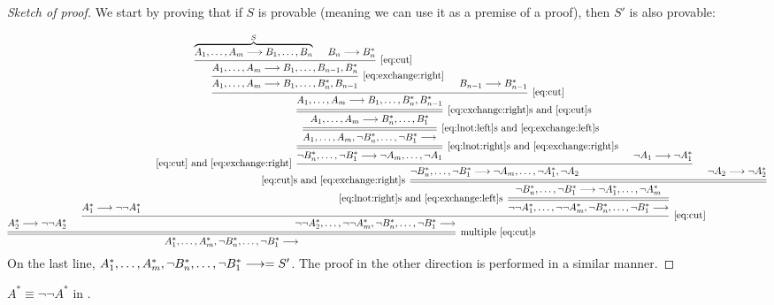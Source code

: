 \documentclass[11pt,a4paper]{article}
\begin{document}
\begin{proof}[Sketch of proof]
    We start by proving that if \(S\) is provable (meaning we can use it as a premise of a proof),
    then \(S'\) is also provable:
    \tiny

    \begin{equation*}
        \begin{prooftree}
            \hypo{A_2^\ast\seq\lnot\lnot A_2^\ast}
            \hypo{A_1^\ast\seq\lnot\lnot A_1^\ast}
            \hypo{\overbrace{A_1,\ldots,A_m\seq B_1,\ldots,B_n}^{S}}
            \hypo{B_n\seq B_n^\ast}
            \infer2[\eqref{eq:cut}]{A_1,\ldots,A_m\seq B_1,\ldots,B_{n-1}, B_n^\ast}
            \infer1[\eqref{eq:exchange:right}]{A_1,\ldots,A_m\seq B_1,\ldots,B_n^\ast, B_{n-1}}
            \hypo{B_{n-1}\seq B_{n-1}^\ast}
            \infer2[\eqref{eq:cut}]{A_1,\ldots,A_m\seq B_1,\ldots,B_n^\ast, B_{n-1}^\ast}
            \infer[double]1[\eqref{eq:exchange:right}s and \eqref{eq:cut}s]{A_1,\ldots,A_m\seq B_n^\ast,\ldots,B_1^\ast}
            \infer[double]1[\eqref{eq:lnot:left}s and \eqref{eq:exchange:left}s]{A_1,\ldots,A_m, \lnot B_n^\ast,\ldots,\lnot B_1^\ast\seq}
            \infer[double]1[\eqref{eq:lnot:right}s and \eqref{eq:exchange:right}s]{\lnot B_n^\ast,\ldots,\lnot B_1^\ast\seq\lnot A_m,\ldots,\lnot A_1}
            \hypo{\lnot A_1\seq \lnot A^\ast_1}
            \infer[left label=\eqref{eq:cut} and \eqref{eq:exchange:right}]2{\lnot B_n^\ast,\ldots,\lnot B_1^\ast\seq\lnot A_m,\ldots,\lnot A_1^\ast,\lnot A_2}
            \hypo{\lnot A_2\seq\lnot A_2^\ast}
            \infer[double,left label=\eqref{eq:cut}s and \eqref{eq:exchange:right}s]2{\lnot B_n^\ast,\ldots,\lnot B_1^\ast\seq\lnot A_1^\ast,\ldots,\lnot A_m^\ast}
            \infer[double,left label=\eqref{eq:lnot:right}s and \eqref{eq:exchange:left}s]1{\lnot\lnot A_1^\ast,\ldots,\lnot\lnot A_m^\ast, \lnot B_n^\ast,\ldots,\lnot B_1^\ast\seq}
            \infer2[\eqref{eq:cut}]{\lnot\lnot A_2^\ast,\ldots,\lnot\lnot A_m^\ast, \lnot B_n^\ast,\ldots,\lnot B_1^\ast\seq}
            \infer[double]2[multiple \eqref{eq:cut}s]{A_1^\ast,\ldots,A_m^\ast, \lnot B_n^\ast,\ldots,\lnot B_1^\ast\seq}
        \end{prooftree}
    \end{equation*}
    \normalsize
    On the last line, \(A_1^\ast,\ldots,A_m^\ast, \lnot B_n^\ast,\ldots,\lnot B_1^\ast\longrightarrow = S'\).
    The proof in the other direction is performed in a similar manner.
\end{proof}

\begin{proposition}[Claim 3]\label{prop:claim 3 in LK vs LJ}
    \(A^\ast\equiv\lnot\lnot A^\ast\) in \LJ.
\end{proposition}
\end{document}
